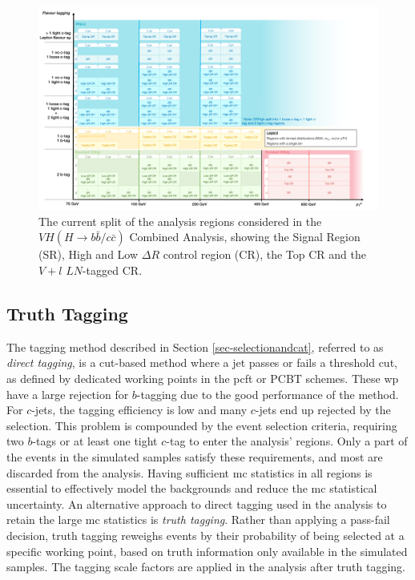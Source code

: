 \newpage

\begin{figure}
    \centering
    \includegraphics[width=\textwidth]{Images/VH/Cat/VH_analysis_cat.pdf}
    \caption{The current split of the analysis regions considered in the $VH (H\rightarrow b\bar{b}/c\bar{c})$ Combined Analysis, showing the Signal Region (SR), High and Low $\Delta R$ control region (CR), the Top CR and the $V+l$ $LN$-tagged CR.} 
    \label{fig:ana-strat-det}
\end{figure}

\clearpage

\subsection{Truth Tagging}
The tagging method described in Section \ref{sec-selectionandcat}, referred to as \textit{direct tagging}, is a cut-based method where a jet passes or fails a threshold cut, as defined by dedicated working points in the \gls{pcft} or PCBT schemes. These \gls{wp} have a large rejection for $b$-tagging due to the good performance of the method. For $c$-jets, the tagging efficiency is low and many $c$-jets end up rejected by the selection. This problem is compounded by the event selection criteria, requiring two $b$-tags or at least one tight $c$-tag to enter the analysis' regions. Only a part of the events in the simulated samples satisfy these requirements, and most are discarded from the analysis. Having sufficient \gls{mc} statistics in all regions is essential to effectively model the backgrounds and reduce the \gls{mc} statistical uncertainty. An alternative approach to direct tagging used in the analysis to retain the large \gls{mc} statistics is \textit{truth tagging}. Rather than applying a pass-fail decision, truth tagging reweighs events by their probability of being selected at a specific working point, based on truth information only available in the simulated samples. The tagging scale factors are applied in the analysis after truth tagging. \\

